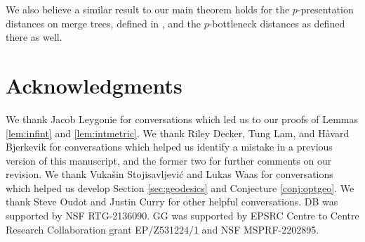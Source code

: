\documentclass{article}
\theoremstyle{definition}
\begin{document}
We also believe a similar result to our main theorem holds for the $p$-presentation distances on merge trees, defined in \cite{cardona2022universal}, and the $p$-bottleneck distances as defined there as well.

\section*{Acknowledgments}
We thank Jacob Leygonie for conversations which led us to our proofs of Lemmas \ref{lem:infint} and \ref{lem:intmetric}. We thank Riley Decker, Tung Lam, and H{\aa}vard Bjerkevik for conversations which helped us identify a mistake in a previous version of this manuscript, and the former two for further comments on our revision. We thank Vuka\v{s}in Stojisavljevi\'{c} and Lukas Waas for conversations which helped us develop Section \ref{sec:geodesics} and Conjecture \ref{conj:optgeo}. We thank Steve Oudot and Justin Curry for other helpful conversations. DB was supported by NSF RTG-2136090. GG was supported by EPSRC Centre to Centre Research Collaboration grant EP/Z531224/1 and NSF MSPRF-2202895.



\end{document}
